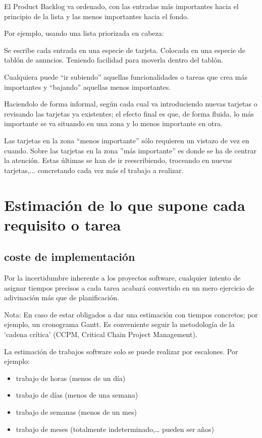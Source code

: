 \documentclass[spanish,12pt,a4paper,final,oneside]{book}
\begin{document}
El Product Backlog va ordenado, con las entradas más importantes hacia el principio de la lista y las menos importantes hacia el fondo.  

Por ejemplo, usando una lista priorizada en cabeza:

Se escribe cada entrada en una especie de tarjeta. Colocada en una especie de tablón de anuncios. Teniendo facilidad para moverla dentro del tablón. 

Cualquiera puede  ``ir subiendo'' aquellas funcionalidades o tareas que crea más importantes y ``bajando'' aquellas menos importantes. 

Haciendolo de forma informal, según cada cual va introduciendo nuevas tarjetas o revisando las tarjetas ya existentes; el efecto final es que, de forma fluida, lo más importante se va situando en una zona y lo menos importante en otra.

Las tarjetas en la zona ``menos importante'' sólo requieren un vistazo de vez en cuando. Sobre las tarjetas en la zona ''más importante'' es donde se ha de centrar la atención. Estas últimas se han de ir reescribiendo, troceando en nuevas tarjetas,... concretando cada vez más el trabajo a realizar.

\section{Estimación de lo que supone cada requisito o tarea}
\subsection{coste de implementación}
Por la incertidumbre inherente a los proyectos software, cualquier intento de asignar tiempos precisos a cada tarea acabará convertido en un mero ejercicio de adivinación más que de planificación.

Nota: En caso de estar obligados a dar una estimación con tiempos concretos; por ejemplo, un cronograma Gantt. Es conveniente seguir la metodología de la ‘cadena crítica’ (CCPM, Critical Chain Project Management).

La estimación de trabajos software solo se puede realizar por escalones. Por ejemplo:
\begin{itemize}
\item trabajo de horas (menos de un día)
\item trabajo de días (menos de una semana)
\item trabajo de semanas (menos de un mes)
\item trabajo de meses (totalmente indeterminado,… pueden ser años)
\end{itemize}
\end{document}
